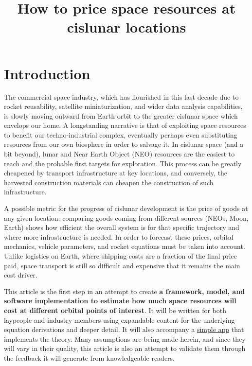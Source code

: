 \documentclass{article}
\title{How to price space resources at cislunar locations}
\author{}
\date{}
\begin{document}
\maketitle

\section{Introduction}
The commercial space industry, which has flourished in this last decade due to rocket reusability, satellite miniaturization, and wider data analysis capabilities, is slowly moving outward from Earth orbit to the greater cislunar space which envelops our home. A longstanding narrative is that of exploiting space resources to benefit our techno-industrial complex, eventually perhaps even substituting resources from our own biosphere in order to salvage it. In cislunar space (and a bit beyond), lunar and Near Earth Object (NEO) resources are the easiest to reach and the probable first targets for exploration. This process can be greatly cheapened by transport infrastructure at key locations, and conversely, the harvested construction materials can cheapen the construction of such infrastructure.

A possible metric for the progress of cislunar development is the price of goods at any given location: comparing goods coming from different sources (NEOs, Moon, Earth) shows how efficient the overall system is for that specific trajectory and where more infrastructure is needed. In order to forecast these prices, orbital mechanics, vehicle parameters, and rocket equations must be taken into account. Unlike logistics on Earth, where shipping costs are a fraction of the final price paid, space transport is still so difficult and expensive that it remains the main cost driver.

This article is the first step in an attempt to create \textbf{a framework, model, and software implementation to estimate how much space resources will cost at different orbital points of interest}. It will be written for both laypeople and industry members using expandable content for the underlying equation derivations and deeper detail. It will also accompany a \href{https://share.streamlit.io/ulfkemmsies/space_pricing_model/main}{simple app} that implements the theory. Many assumptions are being made herein, and since they will vary in their quality, this article is also an attempt to validate them through the feedback it will generate from knowledgeable readers.
\end{document}
